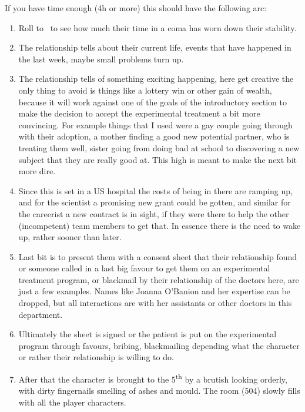 If you have time enough (4h or more) this should have the following arc:
\begin{enumerate}
  \item Roll to~ to see how much their time in a coma has worn down their stability.

  \item The relationship tells about their current life, events that have happened in the last week, maybe small problems turn up.

  \item The relationship tells of something exciting happening, here get creative the only thing to avoid is things like a
        lottery win or other gain of wealth, because it will work against one of the goals of the introductory section to make the
        decision to accept the experimental treatment a bit more convincing.  For example things that I used were a gay couple going
        through with their adoption, a mother finding a good new potential partner, who is treating them well, sister going from doing
        bad at school to discovering a new subject that they are really good at.  This high is meant to make the next bit more dire.

  \item Since this is set in a US hospital the costs of being in there are ramping up, and for the scientist a promising new
        grant could be gotten, and similar for the careerist a new contract is in sight, if they were there to help the other
        (incompetent) team members to get that.  In essence there is the need to wake up, rather sooner than later.

  \item Last bit is to present them with a consent sheet that their relationship found or someone called in a last big favour
        to get them on an experimental treatment program, or blackmail by their relationship of the doctors here, are just a few
        examples.  Names like Joanna O'Banion and her expertise can be dropped, but all interactions are
        with her assistants or other doctors in this department.

  \item Ultimately the sheet is signed or the patient is put on the experimental program through favours, bribing, blackmailing
        depending what the character or rather their relationship is willing to do.

  \item After that the character is brought to the 5\textsuperscript{th} by a brutish looking orderly, with dirty fingernails
        smelling of ashes and mould.  The room (504) slowly fills with all the player characters.
\end{enumerate}

